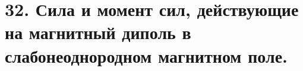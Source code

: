 \section*{32. Сила и момент сил, действующие на магнитный диполь в
слабонеоднородном магнитном поле.}